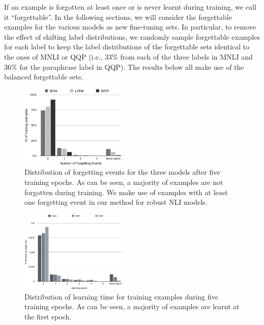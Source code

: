 If an example is forgotten at least once or is never learnt during training, we call it ``forgettable''. %
In the following sections, we will consider the forgettable examples for the various models as new fine-tuning sets. In particular, to remove the effect of shifting label distributions, we randomly sample forgettable examples for each label to keep the label distributions of the forgettable sets identical to the ones of MNLI or QQP (i.e., 33\% from each of the three labels in MNLI and 36\% for the paraphrase label in QQP). The results below all make use of the balanced forgettable sets.


\begin{figure}[t]
\centering
  \includegraphics[width=0.45\textwidth]{figures/ex_by_forg.png}
  \caption{Distribution of forgetting events for the three models after five training epochs. As can be seen, a majority of examples are not forgotten during training. We make use of examples 
  with at least one forgetting event in our method for robust NLI models.}
\label{fig:forgcount-freq}
\end{figure}

\iffalse
\begin{figure}[t]
\centering
  \includegraphics[width=0.45\textwidth]{figures/first_learnt_bar_chart.pdf}
  \caption{Distribution of learning time for training examples during five training epochs. As can be seen, a majority of examples are learnt at the first epoch.}
\label{fig:firstlearnt-freq}
\end{figure}

